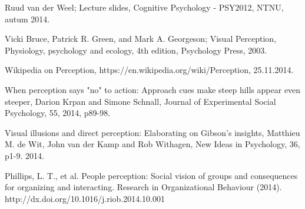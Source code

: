 \documentclass[12pt, a4paper]{article}
\begin{document}
\begin{thebibliography}{1}

Ruud van der Weel; Lecture slides, Cognitive Psychology - PSY2012, NTNU, autum
2014.

Vicki Bruce, Patrick R. Green, and Mark A. Georgeson; Visual Perception,
Physiology, psychology and ecology, 4th edition, Psychology Press, 2003.

Wikipedia on Perception, https://en.wikipedia.org/wiki/Perception, 25.11.2014.


When perception says "no" to action: Approach cues make steep hills appear
even steeper, Darion Krpan and Simone Schnall, Journal of Experimental Social
Psychology, 55, 2014, p89-98.

Visual illusions and direct perception: Elaborating on Gibson's insights,
Matthieu M. de Wit, John van der Kamp and Rob Withagen, New Ideas in
Psychology, 36, p1-9. 2014.

Phillips, L. T., et al. People perception: Social vision of groups and consequences for organizing and
interacting. Research in Organizational Behaviour (2014).
http://dx.doi.org/10.1016/j.riob.2014.10.001 

\end{thebibliography}
\end{document}
